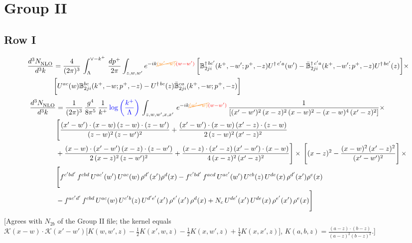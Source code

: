 \documentclass[9pt]{article}
\def\mf#1{\mathbb{#1}}
\numberwithin{equation}{section}
\begin{document}
\section{Group II}
\subsection{Row I}
\begin{align}
    \frac{d^{3}N_{\rm NLO}^{\rm}}{d^{3}k}  & = \frac{4}{(2\pi)^{3}}\,\int_{\Lambda}^{\vee-k^{+}}\, \frac{dp^{+}}{2\pi}\int_{z,w,w^{\prime}} e^{-ik{\color{orange}\cancel{(w^{\prime}-w)}}{\color{red}(w-w^{\prime})}}\, \bigg[\mf{B}^{\dagger\, bc^{\prime}}_{2ji}(k^{+},-w^{\prime};p^{+},-z)U^{\dagger\,c^{\prime}a}(w^{\prime}) -\Bar{\mf{B}}^{\dagger\, c^{\prime}a}_{2ji}(k^{+},-w^{\prime}; p^{+},-z)U^{\dagger\,bc^{\prime}}(z)\bigg]\times\notag \\ & \bigg[U^{ac}(w) \mf{B}^{bc}_{2ji}(k^{+},-w;p^{+},-z) -U^{\dagger\, bc}(z)\Bar{\mf{B}}^{ca}_{2ji}(k^{+},-w; p^{+},-z)\bigg]\nonumber
\end{align}
\begin{align}
 \frac{d^{3}N_{\rm NLO}^{\rm}}{d^{3}k}  & =     \frac{1}{(2\pi)^{3}}\, \frac{g^{4}}{8\pi^{5}}\,\frac{1}{k^{+}}\,{\color{blue}\log{\left(\frac{k^{+}}{\Lambda}\right)}}\,\int_{z,w,w^{\prime},x,x'}\, e^{-ik{\color{orange}\cancel{(w^{\prime}-w)}}{\color{red}(w-w^{\prime})}}\, \frac{1}{\left[(x'-w')^{2}\,(x-z)^{2}\,(x-w)^{2} - (x-w)^{4}\, (x'-z)^{2}\right]} \times\notag \\ & \Bigg[\frac{(x'-w')\cdot (x-w)\, (z-w)\cdot (z-w')}{(z-w)^{2}\, (z-w')^{2}}+\frac{(x'-w')\cdot (x-w)\, (x'-z)\cdot (z-w)}{2\, (z-w)^{2}\, (x'-z)^{2}}\notag \\ & +\frac{(x-w)\cdot (x'-w')\, (x-z)\cdot (z-w')}{2\, (x-z)^{2}\, (z-w')^{2}}+\frac{(x-z)\cdot (x'-z)\, (x'-w')\cdot (x-w)}{4\, (x-z)^{2}\, (x'-z)^{2}}\Bigg] \times\,\Bigg[(x-z)^{2} - \frac{(x-w)^{2}\, (x'-z)^{2}}{(x'-w')^{2}}\Bigg]\,\times \notag \\ & \Bigg[f^{c'bd'}\,f^{cbd}\, U^{ac'}(w')\,U^{ac}(w)\,\rho^{d'}(x')\rho^{d}(x)- f^{c'bd'}\,f^{acd}\,U^{ac'}(w')\,U^{cb}(z)\,U^{de}(x)\,\rho^{d'}(x')\rho^{e}(x) \notag \\ & -f^{ac'd'}\,f^{cbd}\,U^{ac}(w)\,U^{c'b}(z)\,U^{d'e'}(x')\,\rho^{e'}(x')\,\rho^{d}(x) +N_{c}\,U^{de'}(x')\,U^{de}(x)\,\rho^{e'}(x')\,\rho^{e}(x)\Bigg]
\end{align} {\color{red}[Agrees with $N_{2b}$ of the Group II file; the kernel equals $\mathcal{K}(x-w)\cdot\mathcal{K}(x'-w')\big[K(w,w',z)-\frac12K(x',w,z)-\frac12K(x,w',z)+\frac14K(x,x',z)\big]$, $K(a,b,z)=\frac{(a-z)\cdot(b-z)}{(a-z)^{2}(b-z)^{2}}$.]}\par\noindent
\end{document}
